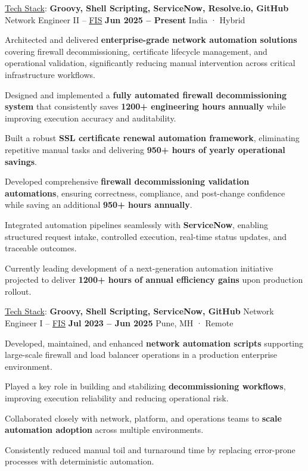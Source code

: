 \documentclass[11pt, a4paper]{awesome-cv}
\begin{document}
\begin{cventries}

\cventry
  {\underline{Tech Stack}: \textbf{Groovy, Shell Scripting, ServiceNow, Resolve.io, GitHub}}
  {Network Engineer II – \underline{FIS}}
  {\textbf{Jun 2025 – Present}}
  {India · Hybrid}
  {
    \begin{cvitems}
      \item {Architected and delivered \textbf{enterprise-grade network automation solutions} covering firewall decommissioning, certificate lifecycle management, and operational validation, significantly reducing manual intervention across critical infrastructure workflows.}
      \item {Designed and implemented a \textbf{fully automated firewall decommissioning system} that consistently saves \textbf{1200+ engineering hours annually} while improving execution accuracy and auditability.}
      \item {Built a robust \textbf{SSL certificate renewal automation framework}, eliminating repetitive manual tasks and delivering \textbf{950+ hours of yearly operational savings}.}
      \item {Developed comprehensive \textbf{firewall decommissioning validation automations}, ensuring correctness, compliance, and post-change confidence while saving an additional \textbf{950+ hours annually}.}
      \item {Integrated automation pipelines seamlessly with \textbf{ServiceNow}, enabling structured request intake, controlled execution, real-time status updates, and traceable outcomes.}
      \item {Currently leading development of a next-generation automation initiative projected to deliver \textbf{1200+ hours of annual efficiency gains} upon production rollout.}
    \end{cvitems}
  }

\vspace{1.2em}

\cventry
  {\underline{Tech Stack}: \textbf{Groovy, Shell Scripting, ServiceNow, GitHub}}
  {Network Engineer I – \underline{FIS}}
  {\textbf{Jul 2023 – Jun 2025}}
  {Pune, MH · Remote}
  {
    \begin{cvitems}
      \item {Developed, maintained, and enhanced \textbf{network automation scripts} supporting large-scale firewall and load balancer operations in a production enterprise environment.}
      \item {Played a key role in building and stabilizing \textbf{decommissioning workflows}, improving execution reliability and reducing operational risk.}
      \item {Collaborated closely with network, platform, and operations teams to \textbf{scale automation adoption} across multiple environments.}
      \item {Consistently reduced manual toil and turnaround time by replacing error-prone processes with deterministic automation.}
    \end{cvitems}
  }


\end{cventries}
\end{document}
